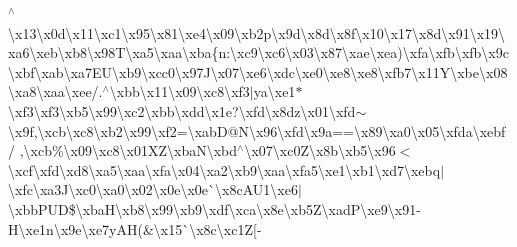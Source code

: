 \begin{DoxyCompactItemize}
$^\wedge$\textbackslash{}x13\textbackslash{}x0d\textbackslash{}x11\textbackslash{}xc1\textbackslash{}x95\textbackslash{}x81\textbackslash{}xe4\textbackslash{}x09\textbackslash{}xb2p\textbackslash{}x9d\textbackslash{}x8d\textbackslash{}x8f\textbackslash{}x10\textbackslash{}x17\textbackslash{}x8d\textbackslash{}x91\textbackslash{}x19\textbackslash{}xa6\textbackslash{}xeb\textbackslash{}xb8\textbackslash{}x98\+T\textbackslash{}xa5\textbackslash{}xaa\textbackslash{}xba\{n\+:\textbackslash{}xc9\textbackslash{}xc6\textbackslash{}x03\textbackslash{}x87\textbackslash{}xae\textbackslash{}xea)\textbackslash{}xfa\textbackslash{}xfb\textbackslash{}xfb\textbackslash{}x9c\textbackslash{}xbf\textbackslash{}xab\textbackslash{}xa7\+E\+U\textbackslash{}xb9\textbackslash{}xcc0\textbackslash{}x97\+J\textbackslash{}x07\textbackslash{}xe6\textbackslash{}xdc\textbackslash{}xe0\textbackslash{}xe8\textbackslash{}xe8\textbackslash{}xfb7\textbackslash{}x11\+Y\textbackslash{}xbe\textbackslash{}x08\textbackslash{}xa8\textbackslash{}xaa\textbackslash{}xee/.$^\wedge$\textbackslash{}xbb\textbackslash{}x11\textbackslash{}x09\textbackslash{}xc8\textbackslash{}xf3$\vert$ya\textbackslash{}xe1$\ast$\textbackslash{}xf3\textbackslash{}xf3\textbackslash{}xb5\textbackslash{}x99\textbackslash{}xc2\textbackslash{}xbb\textbackslash{}xdd\textbackslash{}x1e\textquotesingle{}\textquotesingle{}?\textbackslash{}xfd\textbackslash{}x8dz\textbackslash{}x01\textbackslash{}xfd$\sim$\textbackslash{}x9f,\textbackslash{}xcb\textbackslash{}xc8\textbackslash{}xb2\textbackslash{}x99\textbackslash{}xf2=\textbackslash{}xab\+D@\+N\textbackslash{}x96\textbackslash{}xfd\textbackslash{}x9a==\textbackslash{}x89\textbackslash{}xa0\textbackslash{}x05\textbackslash{}xfda\textbackslash{}xebf/ ,\textbackslash{}xcb\%\textbackslash{}x09\textbackslash{}xc8\textbackslash{}x01\+X\+Z\textbackslash{}xba\+N\textbackslash{}xbd$^\wedge$\textbackslash{}x07\textbackslash{}xc0\+Z\textbackslash{}x8b\textbackslash{}xb5\textbackslash{}x96$<$\textbackslash{}xcf\textbackslash{}xfd\textbackslash{}xd8\textbackslash{}xa5\textbackslash{}xaa\textbackslash{}xfa\textbackslash{}x04\textbackslash{}xa2\textbackslash{}xb9\textbackslash{}xaa\textbackslash{}xfa5\textbackslash{}xe1\textbackslash{}xb1\textbackslash{}xd7\textbackslash{}xebq$\vert$\textbackslash{}xfc\textbackslash{}xa3\+J\textbackslash{}xc0\textbackslash{}xa0\textbackslash{}x02\textbackslash{}x0e\textbackslash{}x0e\`{}\textbackslash{}x8c\+A\+U1\textbackslash{}xe6$\vert$\textbackslash{}xbb\+P\+U\+D\$\textbackslash{}xba\+H\textbackslash{}xb8\textbackslash{}x99\textbackslash{}xb9\textbackslash{}xdf\textbackslash{}xca\textbackslash{}x8e\textbackslash{}xb5\+Z\textbackslash{}xad\+P\textbackslash{}xe9\textbackslash{}x91-\/\+H\textbackslash{}xe1n\textbackslash{}x9e\textbackslash{}xe7y\+A\+H(\&\textbackslash{}x15\`{}\textbackslash{}x8c\textbackslash{}xc1\+Z\mbox{[}-\/ 
\end{DoxyCompactItemize}
